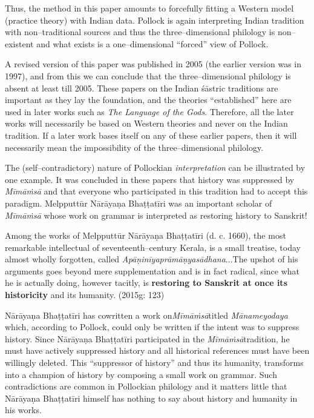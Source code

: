 Thus, the method in this paper amounts to forcefully fitting a Western model (practice theory) with Indian data. Pollock is again interpreting Indian tradition with non–traditional sources and thus the three–dimensional philology is non–existent and what exists is a one–dimensional “forced” view of Pollock.

A revised version of this paper was published in 2005 (the earlier version was in 1997), and from this we can conclude that the three–dimensional philology is absent at least till 2005. These papers on the Indian śāstric traditions are important as they lay the foundation, and the theories “established” here are used in later works such as \textit{The Language of the Gods}. Therefore, all the later works will necessarily be based on Western theories and never on the Indian tradition. If a later work bases itself on any of these earlier papers, then it will necessarily mean the impossibility of the three–dimensional philology.

The (self–contradictory) nature of Pollockian \textit{interpretation} can be illustrated by one example. It was concluded in these papers that history was suppressed by \textit{Mīmāṁsā} and that everyone who participated in this tradition had to accept this paradigm. Melpputtūr Nārāyaṇa Bhaṭṭatīri was an important scholar of \textit{Mīmāṁsā} whose work on grammar is interpreted as restoring history to Sanskrit!

\begin{myquote}
Among the works of Melpputtūr Nārāyaṇa Bhaṭṭatīri (d. c. 1660), the most remarkable intellectual of seventeenth–century Kerala, is a small treatise, today almost wholly forgotten, called \textit{Apāṇinīyaprāmāṇyasādhana}...The upshot of his arguments goes beyond mere supplementation and is in fact radical, since what he is actually doing, however tacitly, is \textbf{restoring to Sanskrit at once its historicity} and its humanity. (2015g: 123)
\end{myquote}

Nārāyaṇa Bhaṭṭatīri has cowritten a work on\textit{Mīmāṁsā}titled \textit{Mānameyodaya }which, according to Pollock, could only be written if the intent was to suppress history. Since Nārāyaṇa Bhaṭṭatīri participated in the \textit{Mīmāṁsā}tradition, he must have actively suppressed history and all historical references must have been willingly deleted. This “suppressor of history” and thus its humanity, transforms into a champion of history by composing a small work on grammar. Such contradictions are common in Pollockian philology and it matters little that Nārāyaṇa Bhaṭṭatīri himself has nothing to say about history and humanity in his works.


